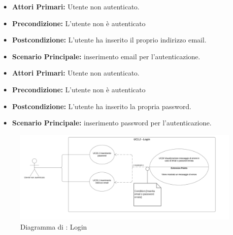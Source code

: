 \resetSubUC
{}
\begin{itemize}
	\item \textbf{Attori Primari:} Utente non autenticato.
	\item \textbf{Precondizione:} L'utente non è autenticato
	\item \textbf{Postcondizione:} L'utente ha inserito il proprio indirizzo email.
	\item \textbf{Scenario Principale:} inserimento email per l'autenticazione.
\end{itemize}

\begin{itemize}
	\item \textbf{Attori Primari:} Utente non autenticato.
	\item \textbf{Precondizione:} L'utente non è autenticato
	\item \textbf{Postcondizione:} L'utente ha inserito la propria password.
	\item \textbf{Scenario Principale:} inserimento password per l'autenticazione.
\end{itemize}


\begin{figure}[H]
	\centering
	\includegraphics[scale=0.6]{Immagini/DiagrammiUC/UC1.2Login.png}
	\caption{Diagramma di \actualUC: Login} 
	\label{fig:Login}
\end{figure}

